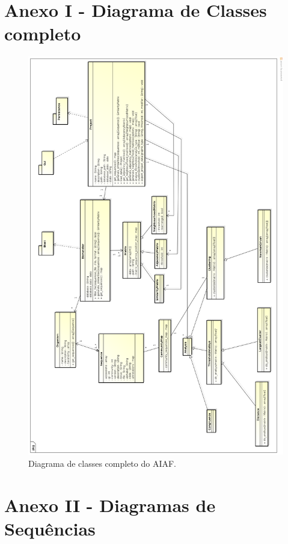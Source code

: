 \appendix

\chapter{Anexo I - Diagrama de Classes completo}

\begin{figure}
\centering
\includegraphics[scale=0.28]{diagrama-classes-completo}
\caption{Diagrama de classes completo do AIAF.}
\label{fig:diagrama-classes-completo}
\end{figure}

\chapter{Anexo II - Diagramas de Sequências}

